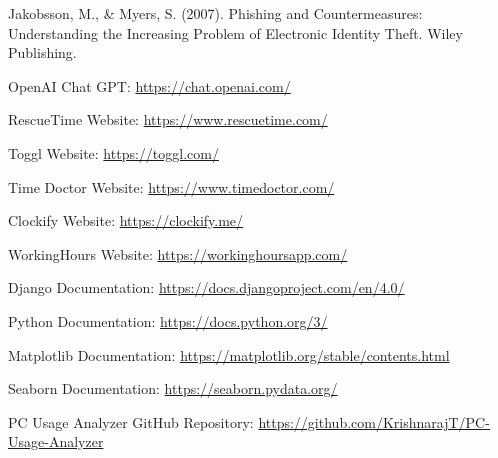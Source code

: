 \documentclass[openany]{report}
\begin{document}
\clearpage
\begin{thebibliography}{10}
    Jakobsson, M., \& Myers, S. (2007). Phishing and Countermeasures: Understanding the Increasing Problem of Electronic Identity Theft. Wiley Publishing.

    OpenAI Chat GPT:
    \url{https://chat.openai.com/}

    \bibitem{}
    RescueTime Website:
    \url{https://www.rescuetime.com/}

    \bibitem{}
    Toggl Website:
    \url{https://toggl.com/}

    \bibitem{}
    Time Doctor Website:
    \url{https://www.timedoctor.com/}

    \bibitem{}
    Clockify Website:
    \url{https://clockify.me/}

    \bibitem{}
    WorkingHours Website:
    \url{https://workinghoursapp.com/}

    \bibitem{}
    Django Documentation:
    \url{https://docs.djangoproject.com/en/4.0/}

    \bibitem{}
    Python Documentation:
    \url{https://docs.python.org/3/}

    \bibitem{}
    Matplotlib Documentation:
    \url{https://matplotlib.org/stable/contents.html}

    \bibitem{}
    Seaborn Documentation:
    \url{https://seaborn.pydata.org/}

    \bibitem{}
    PC Usage Analyzer GitHub Repository:
    \url{https://github.com/KrishnarajT/PC-Usage-Analyzer}

\end{thebibliography}
\end{document}
